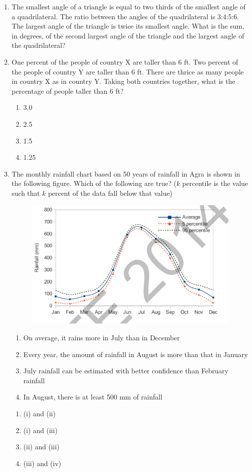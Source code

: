 \documentclass[journal,12pt,onecolumn]{IEEEtran}
\theoremstyle{remark}
\begin{document}
\begin{enumerate}
\item The smallest angle of a triangle is equal to two thirds of the smallest angle of a quadrilateral. The ratio between the angles of the quadrilateral is 3:4:5:6. The largest angle of the triangle is twice its smallest angle. What is the sum, in degrees, of the second largest angle of the triangle and the largest angle of the quadrilateral?

\hfill{}

\item One percent of the people of country X are taller than 6 ft. Two percent of the people of country Y are taller than 6 ft. There are thrice as many people in country X as in country Y. Taking both countries together, what is the percentage of people taller than 6 ft?
\hfill{}
\begin{enumerate}
\item 3.0
\item 2.5
\item 1.5
\item 1.25
\end{enumerate}

\item The monthly rainfall chart based on 50 years of rainfall in Agra is shown in the following figure. Which of the following are true? ($k$ percentile is the value such that $k$ percent of the data fall below that value)

\begin{figure}[H]
\centering
\includegraphics[width=0.5\columnwidth]{figs/q10.png}
\caption*{}
\label{fig:Q.10}
\end{figure}
\begin{enumerate}
\item On average, it rains more in July than in December
\item Every year, the amount of rainfall in August is more than that in January
\item July rainfall can be estimated with better confidence than February rainfall
\item In August, there is at least 500 mm of rainfall
\end{enumerate}

\hfill{}
\begin{enumerate}
\item (i) and (ii)
\item (i) and (iii)
\item (ii) and (iii)
\item (iii) and (iv)
\end{enumerate}
\end{enumerate}
\end{document}
